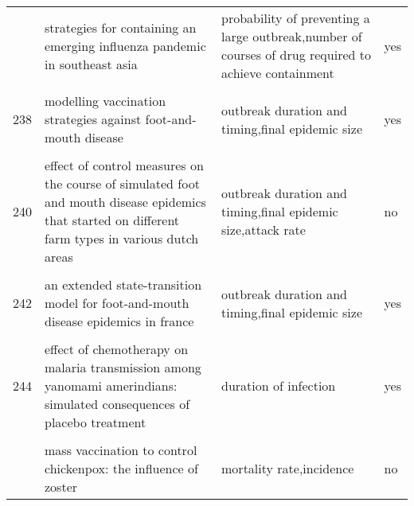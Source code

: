 \documentclass[
]{article}
\begin{document}
\begin{landscape}
\begin{longtable}{l>{\raggedright\arraybackslash}p{4cm}>{\raggedright\arraybackslash}p{6cm}l}
\addlinespace
236 & strategies for containing an emerging influenza pandemic in southeast asia & probability of preventing a large outbreak,number of courses of drug required to achieve containment & yes\\
\cellcolor{gray!6}{237} & \cellcolor{gray!6}{modeling alternative mitigation strategies for a hypothetical outbreak of foot-and-mouth disease in the united states} & \cellcolor{gray!6}{outbreak duration and timing,cost,number of herds slaughtered,number of herds vaccinated} & \cellcolor{gray!6}{no}\\
238 & modelling vaccination strategies against foot-and-mouth disease & outbreak duration and timing,final epidemic size & yes\\
\cellcolor{gray!6}{239} & \cellcolor{gray!6}{a decision-tree to optimise control measures during the early stage of a foot-and-mouth disease epidemic} & \cellcolor{gray!6}{final epidemic size,cost,export losses} & \cellcolor{gray!6}{no}\\
240 & effect of control measures on the course of simulated foot and mouth disease epidemics that started on different farm types in various dutch areas & outbreak duration and timing,final epidemic size,attack rate & no\\
\addlinespace
\cellcolor{gray!6}{241} & \cellcolor{gray!6}{dynamics of the 2001 uk foot and mouth epidemic: stochastic dispersal in a heterogeneous landscape} & \cellcolor{gray!6}{outbreak duration and timing,final epidemic size,total number of animals culled} & \cellcolor{gray!6}{no}\\
242 & an extended state-transition model for foot-and-mouth disease epidemics in france & outbreak duration and timing,final epidemic size & yes\\
\cellcolor{gray!6}{243} & \cellcolor{gray!6}{simulated economic consequences of foot-and-mouth disease epidemics and their public control in france} & \cellcolor{gray!6}{cost} & \cellcolor{gray!6}{no}\\
244 & effect of chemotherapy on malaria transmission among yanomami amerindians: simulated consequences of placebo treatment & duration of infection & yes\\
\cellcolor{gray!6}{245} & \cellcolor{gray!6}{modelling vaccination strategy against directly transmitted diseases using a series of pulses} & \cellcolor{gray!6}{force of infection,proportion of susceptible individuals} & \cellcolor{gray!6}{yes}\\
\addlinespace
246 & mass vaccination to control chickenpox: the influence of zoster & mortality rate,incidence & no\\

\end{longtable}
\end{landscape}
\end{document}
